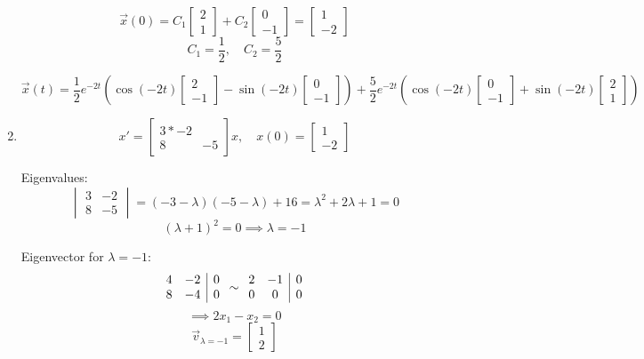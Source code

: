 \documentclass[12pt]{article}
\begin{document}
\begin{enumerate}
    \[\vec{x}(0) = C_1 \begin{bmatrix}
        2\\1
    \end{bmatrix} + C_2 \begin{bmatrix}
        0\\-1
    \end{bmatrix} = \begin{bmatrix}
        1\\-2
    \end{bmatrix}\]
    \[C_1 = \frac{1}{2}, \quad C_2 = \frac{5}{2}\]

    \[\boxed{\vec{x}(t) = \frac{1}{2} e^{-2t} \left(\cos (-2t) \begin{bmatrix}
        2\\-1
    \end{bmatrix} - \sin (-2t )\begin{bmatrix}
        0 \\ -1
    \end{bmatrix}\right) + \frac{5}{2} e^{-2t} \left(\cos (-2t) \begin{bmatrix}
        0\\ -1
    \end{bmatrix}+ \sin (-2t) \begin{bmatrix}
        2\\
        1
    \end{bmatrix}\right)}\]

    \pagebreak 
    \item
    \[x' = \begin{bmatrix}
        3 * -2\\
        8 & -5
    \end{bmatrix}x, \quad x(0) = \begin{bmatrix}
        1\\-2
    \end{bmatrix}\]

    Eigenvalues:
    \[\begin{vmatrix}
        3 & -2\\
        8 & -5
    \end{vmatrix} = (-3 - \lambda)(-5 - \lambda) + 16 = \lambda^2 + 2\lambda + 1 = 0\]
    \[(\lambda + 1)^2 = 0 \implies \lambda = -1\]

    Eigenvector for $\lambda = -1$:
    \[\begin{array}{c c |c}
        4 & -2 & 0\\
        8 & -4 & 0        
    \end{array} \sim \begin{array}{c c | c}
        2 & -1 & 0\\
        0 & 0 & 0
    \end{array}\]
    \[\implies 2x_1 - x_2 = 0\]
    \[\vec{v}_{\lambda = -1} = \begin{bmatrix}
        1\\
        2
    \end{bmatrix}\]


\end{enumerate}
\end{document}
